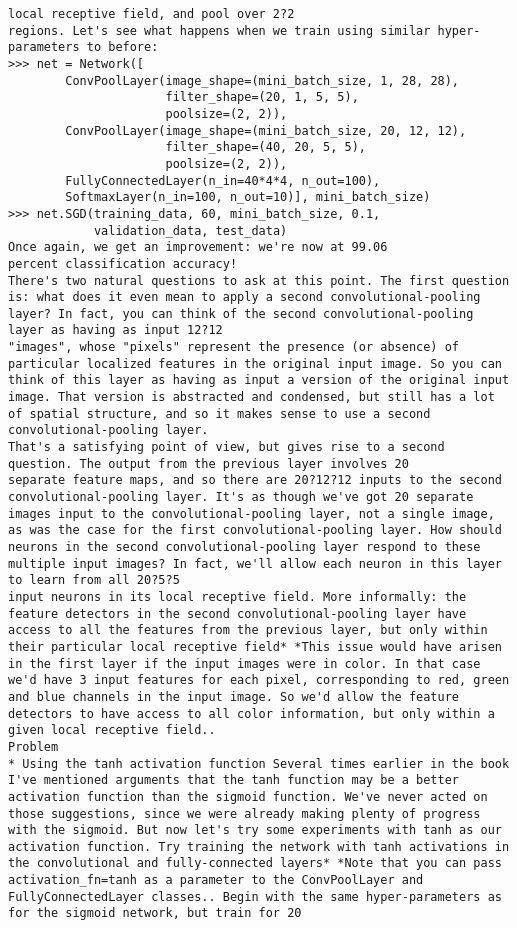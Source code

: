 \begin{lstlisting}
local receptive field, and pool over 2?2
regions. Let's see what happens when we train using similar hyper-parameters to before:
>>> net = Network([
        ConvPoolLayer(image_shape=(mini_batch_size, 1, 28, 28), 
                      filter_shape=(20, 1, 5, 5), 
                      poolsize=(2, 2)),
        ConvPoolLayer(image_shape=(mini_batch_size, 20, 12, 12), 
                      filter_shape=(40, 20, 5, 5), 
                      poolsize=(2, 2)),
        FullyConnectedLayer(n_in=40*4*4, n_out=100),
        SoftmaxLayer(n_in=100, n_out=10)], mini_batch_size)
>>> net.SGD(training_data, 60, mini_batch_size, 0.1, 
            validation_data, test_data)        
Once again, we get an improvement: we're now at 99.06
percent classification accuracy!
There's two natural questions to ask at this point. The first question is: what does it even mean to apply a second convolutional-pooling layer? In fact, you can think of the second convolutional-pooling layer as having as input 12?12
"images", whose "pixels" represent the presence (or absence) of particular localized features in the original input image. So you can think of this layer as having as input a version of the original input image. That version is abstracted and condensed, but still has a lot of spatial structure, and so it makes sense to use a second convolutional-pooling layer.
That's a satisfying point of view, but gives rise to a second question. The output from the previous layer involves 20
separate feature maps, and so there are 20?12?12 inputs to the second convolutional-pooling layer. It's as though we've got 20 separate images input to the convolutional-pooling layer, not a single image, as was the case for the first convolutional-pooling layer. How should neurons in the second convolutional-pooling layer respond to these multiple input images? In fact, we'll allow each neuron in this layer to learn from all 20?5?5
input neurons in its local receptive field. More informally: the feature detectors in the second convolutional-pooling layer have access to all the features from the previous layer, but only within their particular local receptive field* *This issue would have arisen in the first layer if the input images were in color. In that case we'd have 3 input features for each pixel, corresponding to red, green and blue channels in the input image. So we'd allow the feature detectors to have access to all color information, but only within a given local receptive field..
Problem
* Using the tanh activation function Several times earlier in the book I've mentioned arguments that the tanh function may be a better activation function than the sigmoid function. We've never acted on those suggestions, since we were already making plenty of progress with the sigmoid. But now let's try some experiments with tanh as our activation function. Try training the network with tanh activations in the convolutional and fully-connected layers* *Note that you can pass activation_fn=tanh as a parameter to the ConvPoolLayer and FullyConnectedLayer classes.. Begin with the same hyper-parameters as for the sigmoid network, but train for 20

\end{lstlisting}
